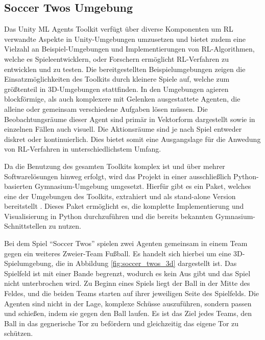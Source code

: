 \documentclass[twocolumn]{webofc}
\begin{document}
\subsection{Soccer Twos Umgebung}

Das Unity \ac{ML} Agents Toolkit verfügt über diverse Komponenten um \ac{RL} verwandte Aspekte in Unity-Umgebungen umzusetzen und bietet zudem eine Vielzahl an Beispiel-Umgebungen und Implementierungen von \ac{RL}-Algorithmen, welche es Spieleentwicklern, oder Forschern ermöglicht \ac{RL}-Verfahren zu entwicklen und zu testen.
Die bereitgestellten Beispielumgebungen zeigen die Einsatzmöglichkeiten des Toolkits durch kleinere Spiele auf, welche zum größtenteil in 3D-Umgebungen stattfinden. In den Umgebungen agieren blockförmige, als auch komplexere mit Gelenken ausgestattete Agenten, die alleine oder gemeinsam verschiedene Aufgaben lösen müssen. Die Beobachtungsräume dieser Agent sind primär in Vektorform dargestellt sowie in einzelnen Fällen auch visuell. Die Aktionsräume sind je nach Spiel entweder diskret oder kontinuierlich. Dies bietet somit eine Ausgangslage für die Anwedung von \ac{RL}-Verfahren in unterschiedlichstem Umfang.

Da die Benutzung des gesamten Toolkits komplex ist und über mehrer Softwarelösungen hinweg erfolgt, wird das Projekt in einer ausschließlich Python-basierten Gymnasium-Umgebung umgesetzt. Hierfür gibt es ein Paket, welches eine der Umgebungen des Toolkits, extrahiert und als stand-alone Version bereitstellt \cite{soccertwos}. Dieses Paket ermöglicht es, die komplette Implementierung und Visualisierung in Python durchzuführen und die bereits bekannten Gymnasium-Schnittstellen zu nutzen.

Bei dem Spiel \enquote{Soccer Twos} spielen zwei Agenten gemeinsam in einem Team gegen ein weiteres Zweier-Team Fußball. Es handelt sich hierbei um eine 3D-Spielumgebung, die in Abbildung \ref{fig:soccer_twos_3d} dargestellt ist. Das Spielfeld ist mit einer Bande begrenzt, wodurch es kein Aus gibt und das Spiel nicht unterbrochen wird. Zu Beginn eines Spiels liegt der Ball in der Mitte des Feldes, und die beiden Teams starten auf ihrer jeweiligen Seite des Spielfelds. Die Agenten sind nicht in der Lage, komplexe Schüsse auszuführen, sondern passen und schießen, indem sie gegen den Ball laufen. Es ist das Ziel jedes Teams, den Ball in das gegnerische Tor zu befördern und gleichzeitig das eigene Tor zu schützen.

\end{document}
